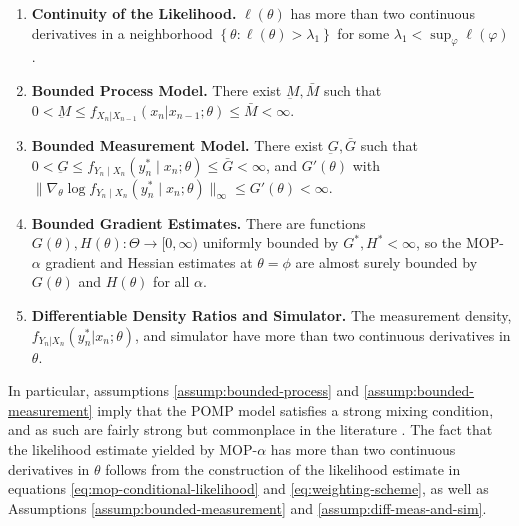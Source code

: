 \documentclass[9pt,twocolumn,pnasresearcharticle]{pnas-new}
\newcommand\arxiv[2]{#2} %
\begin{document}
\arxiv{}{\vspace*{-2mm}}
\begin{enumerate}[label=(A\arabic*),itemsep=-1ex, , font=\small] 
    \item \textbf{Continuity of the Likelihood.} $\ell(\theta)$ has more than two continuous derivatives in a neighborhood $\left\{\theta: \ell(\theta)>\lambda_1\right\}$ for some $\lambda_1<\sup _{\varphi} \ell(\varphi)$.\label{assump:conti-lik}
    \item \textbf{Bounded Process Model.} There exist $\underbar{M}, \bar{M}$ such that $0 < \underbar{M} \leq f_{X_n|X_{n-1}}(x_n | x_{n-1};\theta) \leq \bar{M} < \infty$.\label{assump:bounded-process}
    \item \textbf{Bounded Measurement Model.} There exist $\underbar{G}, \bar{G}$ such that $0<\underbar{G} \leq f_{Y_n \mid X_n}\left(y_n^* \mid x_n; \theta\right) \leq \bar{G}<\infty$, and $G'(\theta)$ with $\|\nabla_\theta \log f_{Y_n \mid X_n}\left(y_n^* \mid x_n; \theta\right)\|_\infty \leq G'(\theta)< \infty$.\label{assump:bounded-measurement}
    \item \textbf{Bounded Gradient Estimates.} There are functions $G(\theta), H(\theta): \Theta \to [0,\infty)$ uniformly bounded by $G^*, H^*<\infty$, so the MOP-$\alpha$ gradient and Hessian estimates at $\theta=\phi$ are almost surely bounded by $G(\theta)$ and $H(\theta)$ for all $\alpha$.\label{assump:local-bounded-derivative}
    \item \textbf{Differentiable Density Ratios and Simulator.} The measurement density, \arxiv{\\}{}$f_{Y_n|X_n}(y_n^*|x_n; \theta)$, and simulator have more than two continuous derivatives in $\theta$.\label{assump:diff-meas-and-sim}
\end{enumerate}
\arxiv{}{\vspace*{-2mm}}

In particular, assumptions \ref{assump:bounded-process} and \ref{assump:bounded-measurement} imply that the POMP model satisfies a strong mixing condition, and as such are fairly strong but commonplace in the literature \cite{karjalainen23, delMoral04}. The fact that the likelihood estimate yielded by MOP-$\alpha$ has more than two continuous derivatives in $\theta$ follows from the construction of the likelihood estimate in equations \ref{eq:mop-conditional-likelihood} and \ref{eq:weighting-scheme}, as well as Assumptions \ref{assump:bounded-measurement} and \ref{assump:diff-meas-and-sim}. 

\arxiv{}{\vspace*{-2mm}}
\end{document}
